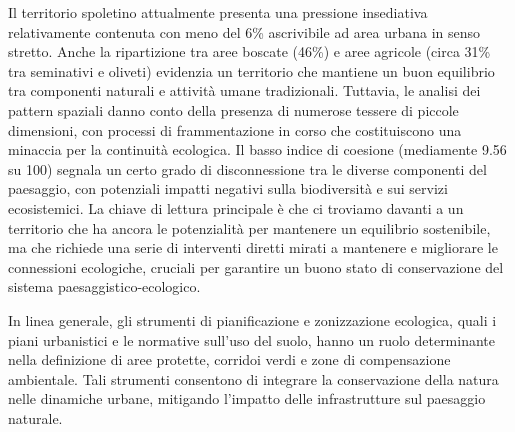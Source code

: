 \documentclass[
  a4paper,
]{book}
\begin{document}
Il territorio spoletino attualmente presenta una pressione insediativa relativamente contenuta con meno del 6\% ascrivibile ad area urbana in senso stretto. Anche la ripartizione tra aree boscate (46\%) e aree agricole (circa 31\% tra seminativi e oliveti) evidenzia un territorio che mantiene un buon equilibrio tra componenti naturali e attività umane tradizionali. Tuttavia, le analisi dei pattern spaziali danno conto della presenza di numerose tessere di piccole dimensioni, con processi di frammentazione in corso che costituiscono una minaccia per la continuità ecologica. Il basso indice di coesione (mediamente 9.56 su 100) segnala un certo grado di disconnessione tra le diverse componenti del paesaggio, con potenziali impatti negativi sulla biodiversità e sui servizi ecosistemici. La chiave di lettura principale è che ci troviamo davanti a un territorio che ha ancora le potenzialità per mantenere un equilibrio sostenibile, ma che richiede una serie di interventi diretti mirati a mantenere e migliorare le connessioni ecologiche, cruciali per garantire un buono stato di conservazione del sistema paesaggistico-ecologico.

In linea generale, gli strumenti di pianificazione e zonizzazione ecologica, quali i piani urbanistici e le normative sull'uso del suolo, hanno un ruolo determinante nella definizione di aree protette, corridoi verdi e zone di compensazione ambientale. Tali strumenti consentono di integrare la conservazione della natura nelle dinamiche urbane, mitigando l'impatto delle infrastrutture sul paesaggio naturale.
\end{document}
